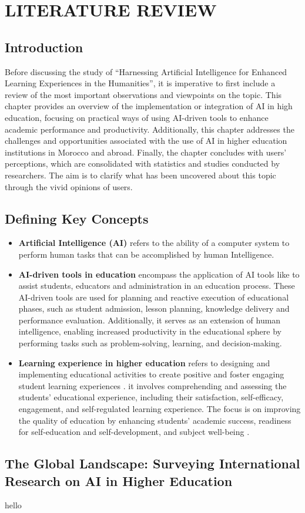 \chapter{LITERATURE REVIEW}\label{ch:literature-review}
\section{Introduction}\label{sec:introduction}
\justifying
Before discussing the study of ``Harnessing Artificial Intelligence for Enhanced
Learning Experiences in the Humanities'', it is imperative to first include a review of the most
important observations and viewpoints on the topic.
This chapter provides an overview of
the implementation or integration of AI in high education, focusing on practical ways of using AI-driven tools
to enhance academic performance and productivity.
Additionally,
this chapter addresses the challenges and opportunities associated with the use of AI in higher education
institutions in Morocco and abroad.
Finally, the chapter concludes with users' perceptions, which are consolidated with
statistics and studies conducted by researchers.
The aim is to clarify
what has been uncovered about this topic through the vivid opinions of users.

\section{Defining Key Concepts}\label{sec:defining-key-concepts}
\begin{itemize}
	\item \textbf{Artificial Intelligence (AI)}\label{AI} refers to the ability of a computer system to perform human
	tasks that can be accomplished by human Intelligence\citep{sadiku_ai_2021}.
	\item \textbf{AI-driven tools in education} encompass the application of AI tools like  to assist 
	students, educators and administration in an education process.
	These AI-driven tools are used for planning and reactive execution of educational phases, such as
	student admission, lesson planning, knowledge delivery and performance evaluation\citep{mallik_proactive_2023}.
	Additionally, it serves as an extension of human intelligence, enabling
	increased productivity in the educational sphere by performing tasks
	such as problem-solving, learning, and decision-making\citep{cheng_widespread_2023}.
	\item \textbf{Learning experience in higher education}  refers to designing and implementing educational activities to create 
	positive and foster engaging student learning experiences \citep{kang_supporting_2023}.
	it involves comprehending and assessing the students’ educational experience, including 
	their satisfaction, self-efficacy, engagement, and self-regulated learning experience\citep{lyz_students_2022}.
	The focus is on improving the quality of education by enhancing students’ academic success, 
	readiness for self-education and self-development, and subject well-being \citep{iordache-platis_building_2018}.
\end{itemize}
\section{The Global Landscape: Surveying International Research on AI in Higher Education}\label{ai-in-world}
hello
